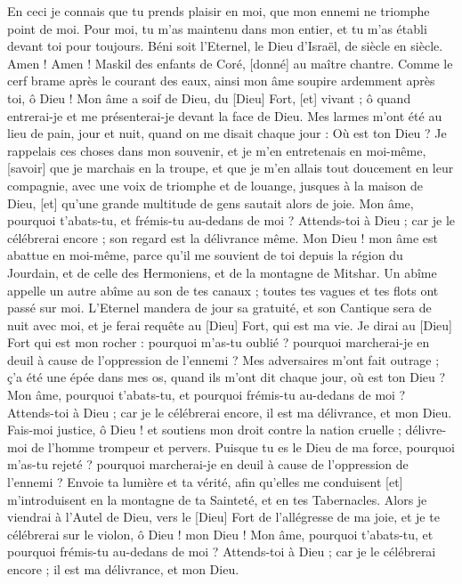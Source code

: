 \begin{multicols}{2}
En ceci je connais que tu prends plaisir en moi, que mon ennemi ne triomphe point de moi.
Pour moi, tu m'as maintenu dans mon entier, et tu m'as établi devant toi pour toujours.
Béni soit l'Eternel, le Dieu d'Israël, de siècle en siècle. Amen ! Amen !
\VerseOne{}Maskil des enfants de Coré, [donné] au maître chantre. Comme le cerf brame après le courant des eaux, ainsi mon âme soupire ardemment après toi, ô Dieu !
Mon âme a soif de Dieu, du [Dieu] Fort, [et] vivant ; ô quand entrerai-je et me présenterai-je devant la face de Dieu.
Mes larmes m'ont été au lieu de pain, jour et nuit, quand on me disait chaque jour : Où est ton Dieu ?
Je rappelais ces choses dans mon souvenir, et je m'en entretenais en moi-même, [savoir] que je marchais en la troupe, et que je m'en allais tout doucement en leur compagnie, avec une voix de triomphe et de louange, jusques à la maison de Dieu, [et] qu'une grande multitude de gens sautait alors de joie.
Mon âme, pourquoi t'abats-tu, et frémis-tu au-dedans de moi ? Attends-toi à Dieu ; car je le célébrerai encore ; son regard est la délivrance même.
Mon Dieu ! mon âme est abattue en moi-même, parce qu'il me souvient de toi depuis la région du Jourdain, et de celle des Hermoniens, et de la montagne de Mitshar.
Un abîme appelle un autre abîme au son de tes canaux ; toutes tes vagues et tes flots ont passé sur moi.
L'Eternel mandera de jour sa gratuité, et son Cantique sera de nuit avec moi, et je ferai requête au [Dieu] Fort, qui est ma vie.
Je dirai au [Dieu] Fort qui est mon rocher : pourquoi m'as-tu oublié ? pourquoi marcherai-je en deuil à cause de l'oppression de l'ennemi ?
Mes adversaires m'ont fait outrage ; ç'a été une épée dans mes os, quand ils m'ont dit chaque jour, où est ton Dieu ?
Mon âme, pourquoi t'abats-tu, et pourquoi frémis-tu au-dedans de moi ? Attends-toi à Dieu ; car je le célébrerai encore, il est ma délivrance, et mon Dieu.
\VerseOne{}Fais-moi justice, ô Dieu ! et soutiens mon droit contre la nation cruelle ; délivre-moi de l'homme trompeur et pervers.
Puisque tu es le Dieu de ma force, pourquoi m'as-tu rejeté ? pourquoi marcherai-je en deuil à cause de l'oppression de l'ennemi ?
Envoie ta lumière et ta vérité, afin qu'elles me conduisent [et] m'introduisent en la montagne de ta Sainteté, et en tes Tabernacles.
Alors je viendrai à l'Autel de Dieu, vers le [Dieu] Fort de l'allégresse de ma joie, et je te célébrerai sur le violon, ô Dieu ! mon Dieu !
Mon âme, pourquoi t'abats-tu, et pourquoi frémis-tu au-dedans de moi ? Attends-toi à Dieu ; car je le célébrerai encore ; il est ma délivrance, et mon Dieu.

\end{multicols}
